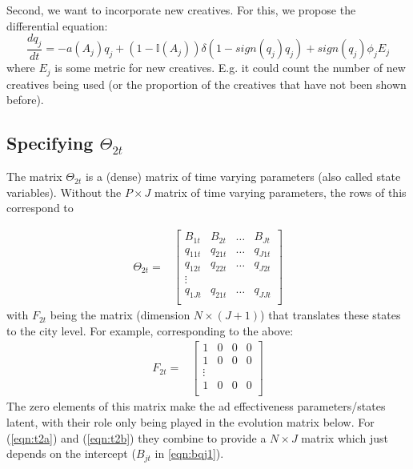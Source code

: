 \documentclass[letter,10pt]{article}
\newcommand{\Igtz}{\mathbb{I}}
\begin{document}
Second, we want to incorporate new creatives.  For this, we propose the differential equation:
\[
\frac{dq_j}{dt} = -a(A_j)q_j +(1-\Igtz(A_j)) \delta (1 - sign(q_j) q_j) + sign(q_j) \phi_j E_j
\]
where $E_j$ is some metric for new creatives.  E.g. it could count the number of new
creatives being used (or the proportion of the creatives that have not been shown before).  


\subsection{Specifying $\Theta_{2t}$}

The matrix $\Theta_{2t}$ is a (dense)  matrix of time varying parameters 
(also called state variables).  Without the $P\times J$ matrix of time varying parameters, the rows of this correspond to 

\begin{equation}
\begin{array}{ll}
      \Theta_{2t} = & \left[\begin{array}{cccl}
		 B_{1t} & B_{2t} &\ldots & B_{Jt} \\
		q_{11t} & q_{21t} & \ldots & q_{J1t} \\
		q_{12t} & q_{22t} & \ldots & q_{J2t} \\
	\vdots\\
		q_{1Jt} & q_{21t} & \ldots & q_{JJt} \\

		\end{array}\right]
\end{array}
\label{eqn:t2a}
\end{equation} 
with $F_{2t}$ being the matrix (dimension $N \times (J+1)$) that translates these states to the city level.  For example, corresponding
to the above:
\begin{equation}
\begin{array}{ll}
      F_{2t} = & \left[\begin{array}{cccl}
		1 & 0 & 0 & 0\\
		1 & 0 & 0 & 0\\
\vdots\\
		1 & 0 & 0 & 0\\
		\end{array}\right]
\end{array}
\label{eqn:t2b}
\end{equation} 
The zero elements of this matrix make the ad effectiveness parameters/states latent, with their
role only being played in the evolution matrix below.   For (\ref{eqn:t2a}) and (\ref{eqn:t2b}) they combine
to provide a $N\times J$ matrix which just depends on the intercept ($B_{jt}$ in \ref{eqn:bqj1}).  
\end{document}
